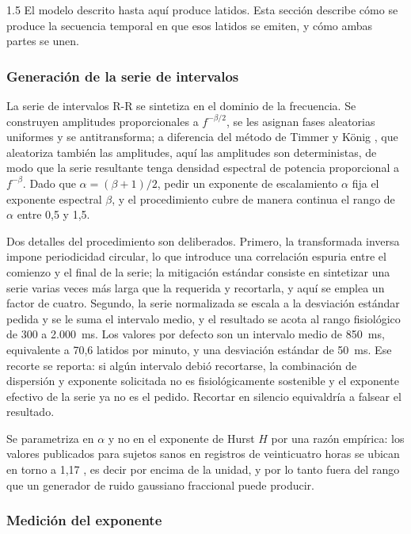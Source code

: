 \begin{spacing}{1.5}
El modelo descrito hasta aquí produce latidos. Esta sección describe cómo se
produce la secuencia temporal en que esos latidos se emiten, y cómo ambas
partes se unen.

\subsubsection{Generación de la serie de intervalos}

La serie de intervalos R-R se sintetiza en el dominio de la frecuencia. Se
construyen amplitudes proporcionales a $f^{-\beta/2}$, se les asignan fases
aleatorias uniformes y se antitransforma; a diferencia del método de Timmer y
König \cite{timmer1995generating}, que aleatoriza también las amplitudes, aquí
las amplitudes son deterministas, de modo que la serie resultante tenga
densidad espectral de potencia proporcional a $f^{-\beta}$. Dado que
$\alpha = (\beta+1)/2$, pedir un exponente de escalamiento $\alpha$ fija el
exponente espectral $\beta$, y el procedimiento cubre de manera continua el
rango de $\alpha$ entre 0,5 y 1,5.

Dos detalles del procedimiento son deliberados. Primero, la transformada
inversa impone periodicidad circular, lo que introduce una correlación espuria
entre el comienzo y el final de la serie; la mitigación estándar consiste en
sintetizar una serie varias veces más larga que la requerida y recortarla, y
aquí se emplea un factor de cuatro. Segundo, la serie normalizada se escala a la
desviación estándar pedida y se le suma el intervalo medio, y el resultado se
acota al rango fisiológico de 300 a 2.000~ms. Los valores por defecto son un
intervalo medio de 850~ms, equivalente a 70,6 latidos por minuto, y una
desviación estándar de 50~ms. Ese recorte se reporta: si algún intervalo debió
recortarse, la combinación de dispersión y exponente solicitada no es
fisiológicamente sostenible y el exponente efectivo de la serie ya no es el
pedido. Recortar en silencio equivaldría a falsear el resultado.

Se parametriza en $\alpha$ y no en el exponente de Hurst $H$ por una razón
empírica: los valores publicados para sujetos sanos en registros de
veinticuatro horas se ubican en torno a 1,17
\cite{costa2017fragmentation}, es decir por encima de la unidad, y por lo tanto
fuera del rango que un generador de ruido gaussiano fraccional puede producir.

\subsubsection{Medición del exponente}


\end{spacing}
